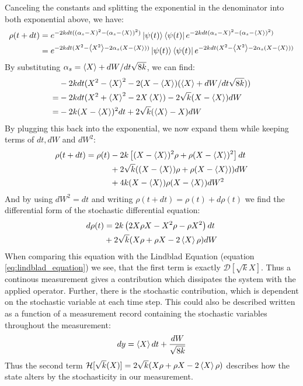 Canceling the constants and splitting the exponential in the denominator into both exponential above, we have:
\begin{align*}
    \rho(t + dt) &= e^{-2k dt ((\alpha_s - X)^2 - (\alpha_s - \expval{X})^2)} \ket{\psi(t)}\bra{\psi(t)}e^{-2k dt (\alpha_s - X)^2 - (\alpha_s - \expval{X})^2)} \\
            &= e^{-2kdt (X^2 - \expval{X^2} - 2 \alpha_s(X - \expval{X}))}\ket{\psi(t)}\bra{\psi(t)}  e^{-2kdt (X^2 - \expval{X^2} - 2 \alpha_s(X - \expval{X}))}
\end{align*}
By substituting $\alpha_s = \expval{X} + {dW}/{dt \sqrt{8k}}$, we can find:
\begin{align*}
       &-2kdt (X^2 - \expval{X}^2 - 2(X - \expval{X})(\expval{X} + {dW}/{dt \sqrt{8k}})) \\
     = &-2kdt(X^2 + \expval{X}^2 - 2 X \expval{X}) - 2\sqrt{k}(X -\expval{X})dW \\
     = &-2k(X - \expval{X})^2dt + 2\sqrt{k}(\expval{X} - X)dW
\end{align*}
By plugging this back into the exponential, we now expand them while keeping terms of $dt, dW$ and $dW^2$:
\begin{align*}
    \rho(t+ dt) = \rho(t) &- 2k\left[(X - \expval{X})^2\rho + \rho(X - \expval{X})^2 \right]dt \\
                          &+ 2\sqrt{k}((X -\expval{X})\rho + \rho(X -\expval{X}))dW \\
                          &+ 4k (X -\expval{X})\rho (X -\expval{X}) dW^2
\end{align*}
And by using $dW^2 = dt$ and writing $\rho(t +dt) = \rho(t) + d\rho(t)$ we find the differential form of the stochastic differential equation:
\begin{align}
    d\rho(t) &=  2k\left(2 X\rho X - X^2\rho - \rho X^2\right)dt \\
                          &+ 2\sqrt{k}(X\rho + \rho X - 2 \expval{X}\rho)dW
\end{align}
When comparing this equation with the Lindblad Equation (equation \ref{eq:lindblad_equation}) we see, that the first term is exactly $\mathcal{D}[\sqrt{k}X]$. Thus a continous measurement gives a contribution which dissipates the system with the applied operator. Further, there is the stochastic contribution, which is dependent on the stochastic variable at each time step. This could also be described written as a function of a measurement record containing the stochastic variables throughout the measurement:
\begin{equation}
    dy = \expval{X}dt + \frac{dW}{\sqrt{8k}}
\end{equation}
Thus the second term $\mathcal{H}[\sqrt{k}(X)]=2\sqrt{k}(X\rho + \rho X - 2 \expval{X}\rho)$ describes how the state alters by the stochasticity in our measurement.


